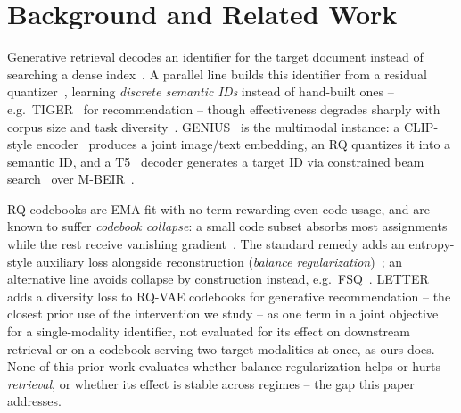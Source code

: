 \section{Background and Related Work}
\label{sec:background}

Generative retrieval decodes an identifier for the target document instead of searching a dense index~\cite{tay2022dsi,decao2021genre}. A parallel line builds this identifier from a residual quantizer~\cite{lee2022rqvae}, learning \emph{discrete semantic IDs} instead of hand-built ones -- e.g.\ TIGER~\cite{rajput2023tiger} for recommendation -- though effectiveness degrades sharply with corpus size and task diversity~\cite{pradeep2023scale}. GENIUS~\cite{kim2025genius} is the multimodal instance: a CLIP-style encoder~\cite{radford2021clip} produces a joint image/text embedding, an RQ quantizes it into a semantic ID, and a T5~\cite{raffel2020t5} decoder generates a target ID via constrained beam search~\cite{decao2021genre} over M-BEIR~\cite{wei2024uniir}.

RQ codebooks are EMA-fit with no term rewarding even code usage, and are known to suffer \emph{codebook collapse}: a small code subset absorbs most assignments while the rest receive vanishing gradient~\cite{vandenoord2017vqvae}. The standard remedy adds an entropy-style auxiliary loss alongside reconstruction (\emph{balance regularization})~\cite{zhang2023regularizedvq}; an alternative line avoids collapse by construction instead, e.g.\ FSQ~\cite{mentzer2024fsq}. LETTER~\cite{wang2024letter} adds a diversity loss to RQ-VAE codebooks for generative recommendation -- the closest prior use of the intervention we study -- as one term in a joint objective for a single-modality identifier, not evaluated for its effect on downstream retrieval or on a codebook serving two target modalities at once, as ours does. None of this prior work evaluates whether balance regularization helps or hurts \emph{retrieval}, or whether its effect is stable across regimes -- the gap this paper addresses.
